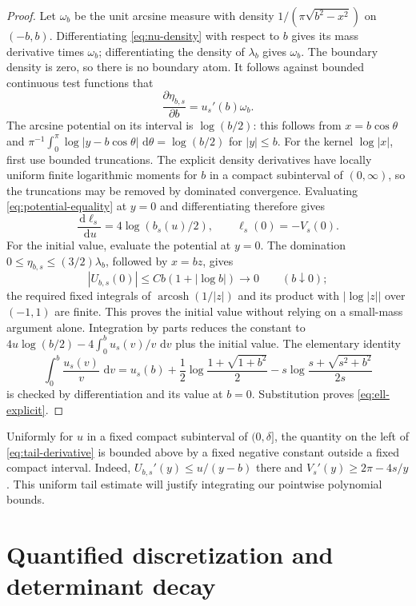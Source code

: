 \documentclass[11pt,letterpaper]{article}
\theoremstyle{definition}
\newcommand{\dd}{\,\mathrm d}
\DeclareMathOperator{\arcosh}{arcosh}
\begin{document}
\begin{proof}
Let $\omega_b$ be the unit arcsine measure with density
$1/(\pi\sqrt{b^2-x^2})$ on $(-b,b)$. Differentiating
\eqref{eq:nu-density} with respect to $b$ gives its mass derivative times
$\omega_b$; differentiating the density of $\lambda_b$ gives $\omega_b$.
The boundary density is zero, so there is no boundary atom. It follows
against bounded continuous test functions that
\[
 \frac{\partial\eta_{b,s}}{\partial b}=u_s'(b)\omega_b.
\]
The arcsine potential on its interval is $\log(b/2)$: this follows from
$x=b\cos\theta$ and
$\pi^{-1}\int_0^\pi\log|y-b\cos\theta|\,\dd\theta=\log(b/2)$
for $|y|\le b$. For the kernel $\log|x|$, first use bounded truncations.
The explicit density derivatives have locally uniform finite logarithmic
moments for $b$ in a compact subinterval of $(0,\infty)$, so the truncations
may be removed by dominated convergence. Evaluating
\eqref{eq:potential-equality} at $y=0$ and differentiating therefore gives
\[
 \frac{\dd\ell_s}{\dd u}=4\log(b_s(u)/2),\qquad
 \ell_s(0)=-V_s(0).
\]
For the initial value, evaluate the potential at $y=0$.
The domination $0\le\eta_{b,s}\le(3/2)\lambda_b$, followed by $x=bz$, gives
\[
 |U_{b,s}(0)|\le Cb(1+|\log b|)\longrightarrow0
 \qquad(b\downarrow0);
\]
the required fixed integrals of $\arcosh(1/|z|)$ and its product with
$|\log|z||$ over $(-1,1)$ are finite. This proves the initial value
without relying on a small-mass argument alone.
Integration by parts reduces the constant to
$4u\log(b/2)-4\int_0^b u_s(v)/v\,\dd v$ plus the initial value. The elementary
identity
\[
 \int_0^b\frac{u_s(v)}v\,\dd v
 =u_s(b)+\frac12\log\frac{1+\sqrt{1+b^2}}2
       -s\log\frac{s+\sqrt{s^2+b^2}}{2s}
\]
is checked by differentiation and its value at $b=0$. Substitution proves
\eqref{eq:ell-explicit}.
\end{proof}

Uniformly for $u$ in a fixed compact subinterval of $(0,\delta]$, the
quantity on the left of \eqref{eq:tail-derivative} is bounded above by a
fixed negative constant outside a fixed compact interval. Indeed,
$U_{b,s}'(y)\le u/(y-b)$ there and
$V_s'(y)\ge2\pi-4s/y$. This uniform tail estimate will justify integrating
our pointwise polynomial bounds.


\section{Quantified discretization and determinant decay}\label{sec:discretization}
\end{document}

